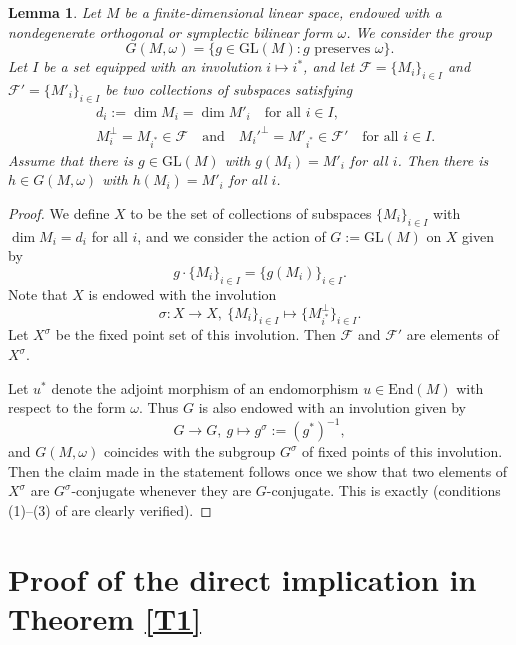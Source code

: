 \documentclass[12pt]{amsart}
\newcommand{\GL}{\mathrm{GL}}
\newcommand{\Ff}{\mathcal{F}}
\numberwithin{equation}{section}
\newtheorem{lemma}[theorem]{Lemma}
\theoremstyle{definition}
\begin{document}
\begin{lemma}
\label{L3}
Let $M$ be a finite-dimensional linear space, endowed with a nondegenerate orthogonal or symplectic bilinear form $\omega$.
We consider the group 
\[G(M,\omega)=\{g\in\GL(M):\mbox{$g$ preserves $\omega$}\}.\]
Let 
$I$ be a set equipped with an involution $i\mapsto i^*$, and let
$\Ff=\{M_i\}_{i\in I}$ and $\Ff'=\{M'_i\}_{i\in I}$ be two collections of subspaces satisfying
\begin{eqnarray*}
 & d_i:=\dim M_i=\dim M'_i\quad\mbox{for all $i\in I$}, \\
 & M_i^\perp =M_{i^*}\in \Ff\quad\mbox{and}\quad M_i'^\perp=M'_{i^*}\in\Ff'\quad\mbox{for all $i\in I$}.
\end{eqnarray*}
Assume that there is $g\in \GL(M)$ with $g(M_i)=M'_i$ for all $i$. Then there is $h\in G(M,\omega)$ with $h(M_i)=M'_i$ for all $i$.
\end{lemma}

\begin{proof}
We define $X$ to be the set of collections of subspaces $\{M_i\}_{i\in I}$ with  $\dim M_i=d_i$ for all $i$, and we consider the action of $G:=\GL(M)$ on $X$ given by
\[g\cdot \{M_i\}_{i\in I}=\{g(M_i)\}_{i\in I}.\]
Note that $X$ is endowed with the involution
\[\sigma:X\to X,\ \{M_i\}_{i\in I}\mapsto \{M_{i^*}^\perp\}_{i\in I}.\]
Let $X^\sigma$ be the fixed point set of this involution. Then $\mathcal{F}$ and $\Ff'$ are elements of $X^\sigma$.

Let $u^*$  denote the adjoint morphism of an endomorphism $u\in\mathrm{End}(M)$ with respect to the form $\omega$. Thus $G$ is also endowed with an involution given by
\[G\to G,\ g\mapsto g^\sigma:=(g^*)^{-1},\]
and $G(M,\omega)$ coincides with the subgroup $G^\sigma$ of fixed points of this involution. Then the claim made in the statement follows once we show that two elements of $X^\sigma$ are $G^\sigma$-conjugate whenever they are $G$-conjugate. This is exactly \cite[Proposition 2.1]{MWZ2} (conditions (1)--(3) of \cite[Proposition 2.1]{MWZ2} are clearly verified).
\end{proof}




\section{Proof of the direct implication in Theorem \ref{T1}}
\end{document}
